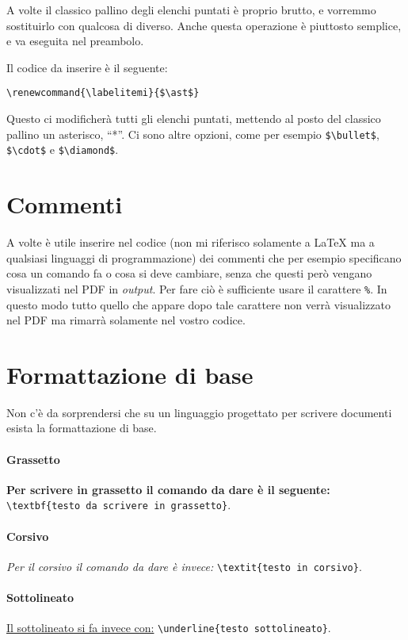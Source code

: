 A volte il classico pallino degli elenchi puntati è proprio brutto, e vorremmo
sostituirlo con qualcosa di diverso.
Anche questa operazione è piuttosto semplice, e va eseguita nel preambolo.

\noindent Il codice da inserire è il seguente:

\verb!\renewcommand{\labelitemi}{$\ast$}!

\noindent Questo ci modificherà tutti gli elenchi puntati, mettendo al posto
del classico pallino un asterisco, ``*''. Ci sono altre opzioni, come per
esempio \verb!$\bullet$!, \verb!$\cdot$! e \verb!$\diamond$!.

\section{Commenti}
A volte è utile inserire nel codice (non mi riferisco solamente a \LaTeX{} ma 
a qualsiasi linguaggi di programmazione) dei commenti che per esempio 
specificano cosa un comando fa o cosa si deve cambiare, senza che questi però 
vengano visualizzati nel PDF in \textit{output}. Per fare ciò è sufficiente 
usare il carattere \texttt{\%}. In questo modo tutto quello che appare dopo 
tale carattere non verrà visualizzato nel PDF ma rimarrà solamente nel vostro 
codice.

\section{Formattazione di base}

Non c'è da sorprendersi che su un linguaggio progettato per scrivere documenti
esista la formattazione di base.

\paragraph*{Grassetto} \textbf{Per scrivere in grassetto il comando da dare è
il seguente: }\verb!\textbf{testo da scrivere in grassetto}!.

\paragraph*{Corsivo} \textit{Per il corsivo il comando da dare è invece: }
\verb!\textit{testo in corsivo}!.

\paragraph*{Sottolineato} \underline{Il sottolineato si fa invece con:}
\verb!\underline{testo sottolineato}!.

